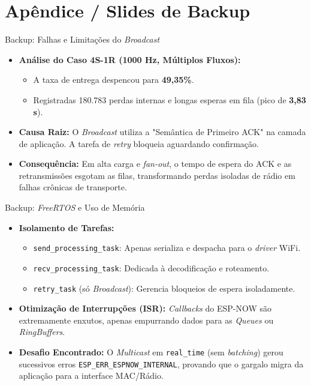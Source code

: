 \appendix
\section*{Apêndice / Slides de Backup}

\begin{frame}{Backup: Falhas e Limitações do \textit{Broadcast}}
    \begin{itemize}
        \item \textbf{Análise do Caso 4S-1R (1000 Hz, Múltiplos Fluxos):}
        \begin{itemize}
            \item A taxa de entrega despencou para \textbf{49,35\%}.
            \item Registradas 180.783 perdas internas e longas esperas em fila (pico de \textbf{3,83 s}).
        \end{itemize}
        \item \textbf{Causa Raiz:} O \textit{Broadcast} utiliza a "Semântica de Primeiro ACK" na camada de aplicação. A tarefa de \textit{retry} bloqueia aguardando confirmação.
        \item \textbf{Consequência:} Em alta carga e \textit{fan-out}, o tempo de espera do ACK e as retransmissões esgotam as filas, transformando perdas isoladas de rádio em falhas crônicas de transporte.
    \end{itemize}
\end{frame}

\begin{frame}{Backup: \textit{FreeRTOS} e Uso de Memória}
    \begin{itemize}
        \item \textbf{Isolamento de Tarefas:}
        \begin{itemize}
            \item \texttt{send\_processing\_task}: Apenas serializa e despacha para o \textit{driver} WiFi.
            \item \texttt{recv\_processing\_task}: Dedicada à decodificação e roteamento.
            \item \texttt{retry\_task} (só \textit{Broadcast}): Gerencia bloqueios de espera isoladamente.
        \end{itemize}
        \item \textbf{Otimização de Interrupções (ISR):} \textit{Callbacks} do ESP-NOW são extremamente enxutos, apenas empurrando dados para as \textit{Queues} ou \textit{RingBuffers}.
        \item \textbf{Desafio Encontrado:} O \textit{Multicast} em \texttt{real\_time} (sem \textit{batching}) gerou sucessivos erros \texttt{ESP\_ERR\_ESPNOW\_INTERNAL}, provando que o gargalo migra da aplicação para a interface MAC/Rádio.
    \end{itemize}
\end{frame}
